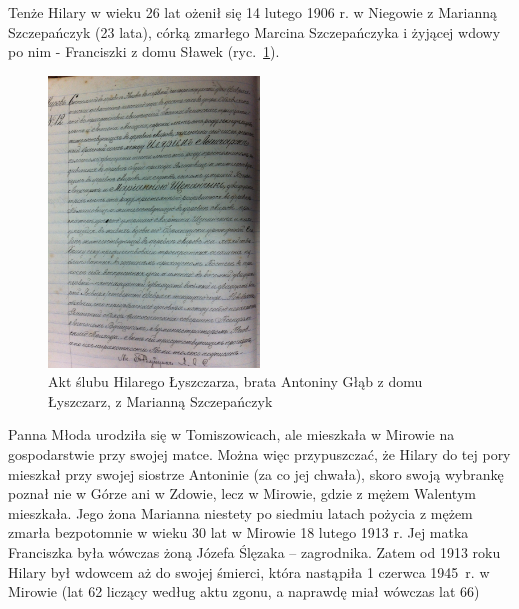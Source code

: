 Tenże Hilary w wieku 26 lat ożenił się 14 lutego 1906 r. w Niegowie z Marianną Szczepańczyk (23 lata), córką zmarłego Marcina Szczepańczyka i żyjącej wdowy po nim - Franciszki z domu Sławek (ryc.~\ref{rys:akt_slubu_marianny_i_hilarego_lyszczarzow}).

\begin{figure}[!h]
\begin{center}
\includegraphics[width=0.5\textwidth]{zdjecia/akt_slubu_marianny_i_hilarego_lyszczarzow.jpg}
\caption[Akt ślubu Hilarego Łyszczarza z Marianną Szczepańczyk]{Akt ślubu Hilarego Łyszczarza, brata Antoniny Głąb z domu Łyszczarz, z Marianną Szczepańczyk}
\label{rys:akt_slubu_marianny_i_hilarego_lyszczarzow}
\end{center}
\end{figure}

Panna Młoda urodziła się w Tomiszowicach, ale mieszkała w Mirowie na gospodarstwie przy swojej matce. Można więc przypuszczać, że Hilary do tej pory mieszkał przy swojej siostrze Antoninie (za co jej chwała), skoro swoją wybrankę poznał nie w Górze ani w Zdowie, lecz w Mirowie, gdzie z mężem Walentym mieszkała. Jego żona Marianna niestety po siedmiu latach pożycia z mężem zmarła bezpotomnie w wieku 30 lat w Mirowie 18 lutego 1913 r. Jej matka Franciszka była wówczas żoną Józefa Ślęzaka -- zagrodnika. Zatem od 1913 roku Hilary był wdowcem aż do swojej śmierci, która nastąpiła 1 czerwca 1945~r. w Mirowie (lat 62 liczący według aktu zgonu, a naprawdę miał wówczas lat 66)

